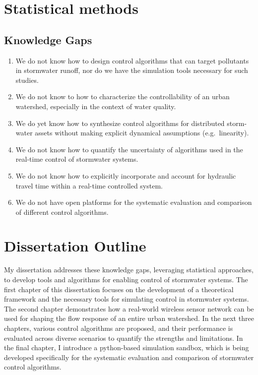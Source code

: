 \section{Statistical methods}

\subsection*{Knowledge Gaps}
\begin{enumerate}
	\item We do not know how to design control algorithms that can target pollutants in stormwater runoff, nor do we have the simulation tools necessary for such studies.
	\item We do not know to how to characterize the controllability of an urban watershed, especially in the context of water quality.
	\item We do yet know how to synthesize control algorithms for distributed storm-water assets without making explicit dynamical assumptions (e.g.\ linearity).
	\item We do not know how to quantify the uncertainty of algorithms used in the real-time control of stormwater systems.
	\item We do not know how to explicitly incorporate and account for hydraulic travel time within a real-time controlled system.
	\item We do not have open platforms for the systematic evaluation and comparison of different control algorithms.
\end{enumerate}


\section{Dissertation Outline}
My dissertation addresses these knowledge gaps, leveraging statistical approaches, to develop tools and algorithms for enabling control of stormwater systems. 
The first chapter of this dissertation focuses on the development of a theoretical framework and the necessary tools for simulating control in stormwater systems. 
The second chapter demonstrates how a real-world wireless sensor network can be used for shaping the flow response of an entire urban watershed. 
In the next three chapters, various control algorithms are proposed, and their performance is evaluated across diverse scenarios to quantify the strengths and limitations.
In the final chapter, I introduce a python-based simulation sandbox, which is being developed specifically for the systematic evaluation and comparison of stormwater control algorithms.

